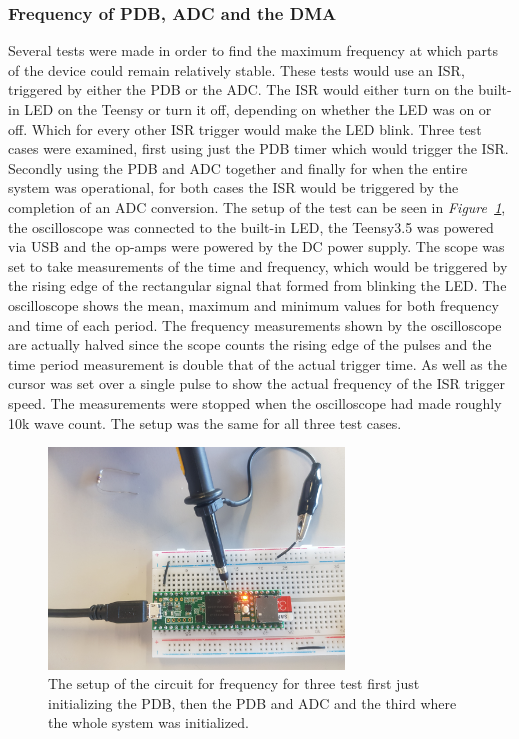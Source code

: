 \subsubsection{Frequency of PDB, ADC and the DMA}

Several tests were made in order to find the maximum frequency at which parts of the device could remain relatively stable.
These tests would use an ISR, triggered by either the PDB or the ADC.
The ISR would either turn on the built-in LED on the Teensy or turn it off, depending on whether the LED was on or off.
Which for every other ISR trigger would make the LED blink.
Three test cases were examined, first using just the PDB timer which would trigger the ISR. 
Secondly using the PDB and ADC together and finally for when the entire system was operational, for both cases the ISR would be triggered by the completion of an ADC conversion.
The setup of the test can be seen in \textit{Figure~\ref{fig:SetupCircSpeed}}, the oscilloscope was connected to the built-in LED, the Teensy3.5 was powered via USB and the op-amps were powered by the DC power supply.
The scope was set to take measurements of the time and frequency, which would be triggered by the rising edge of the rectangular signal that formed from blinking the LED. 
The oscilloscope shows the mean, maximum and minimum values for both frequency and time of each period.
The frequency measurements shown by the oscilloscope are actually halved since the scope counts the rising edge of the pulses and the time period measurement is double that of the actual trigger time.
As well as the cursor was set over a single pulse to show the actual frequency of the ISR trigger speed.
The measurements were stopped when the oscilloscope had made roughly 10k wave count.
The setup was the same for all three test cases.


\begin{figure}[h]
    \centering
    \includegraphics[width=0.7\textwidth]{graphics/SetupCircSpeed.jpg}
    \caption{The setup of the circuit for frequency for three test first just initializing the PDB, then the PDB and ADC and the third where the whole system was initialized.}
    \label{fig:SetupCircSpeed}
\end{figure}

